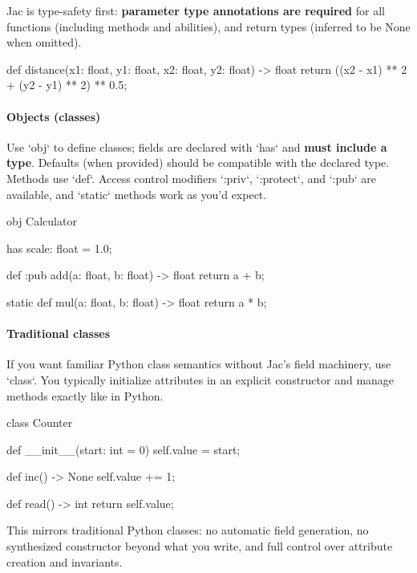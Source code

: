 Jac is type-safety first: \textbf{parameter type annotations are required} for all functions (including methods and abilities), and return types (inferred to be None when omitted).

\begin{jacblock}
def distance(x1: float, y1: float, x2: float, y2: float) -> float {
    return ((x2 - x1) ** 2 + (y2 - y1) ** 2) ** 0.5;
}
\end{jacblock}

\paragraph{Objects (classes)}

Use `obj` to define classes; fields are declared with `has` and \textbf{must include a type}. Defaults (when provided) should be compatible with the declared type. Methods use `def`. Access control modifiers `:priv`, `:protect`, and `:pub` are available, and `static` methods work as you'd expect.

\begin{jacblock}
obj Calculator {
    has scale: float = 1.0;

    def :pub add(a: float, b: float) -> float {
        return a + b;
    }

    static def mul(a: float, b: float) -> float {
        return a * b;
    }
}
\end{jacblock}

\paragraph{Traditional classes}

If you want familiar Python class semantics without Jac's field machinery, use `class`. You typically initialize attributes in an explicit constructor and manage methods exactly like in Python.

\begin{jacblock}
class Counter {
    def __init__(start: int = 0) {
        self.value = start;
    }

    def inc() -> None { self.value += 1; }

    def read() -> int { return self.value; }
}
\end{jacblock}

This mirrors traditional Python classes: no automatic field generation, no synthesized constructor beyond what you write, and full control over attribute creation and invariants.

